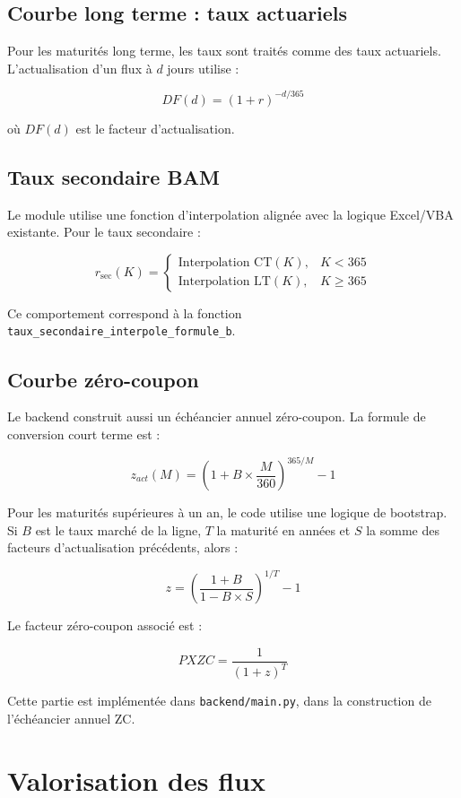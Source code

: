 \documentclass[12pt,a4paper]{article}
\begin{document}
\subsection{Courbe long terme : taux actuariels}

Pour les maturités long terme, les taux sont traités comme des taux actuariels. L'actualisation d'un flux à $d$ jours utilise :

\[
DF(d) = (1+r)^{-d/365}
\]

où $DF(d)$ est le facteur d'actualisation.

\subsection{Taux secondaire BAM}

Le module utilise une fonction d'interpolation alignée avec la logique Excel/VBA existante. Pour le taux secondaire :

\[
r_{\text{sec}}(K) =
\begin{cases}
\text{Interpolation CT}(K), & K < 365 \\
\text{Interpolation LT}(K), & K \geq 365
\end{cases}
\]

Ce comportement correspond à la fonction \texttt{taux\_secondaire\_interpole\_formule\_b}.

\subsection{Courbe zéro-coupon}

Le backend construit aussi un échéancier annuel zéro-coupon. La formule de conversion court terme est :

\[
z_{act}(M)
=
\left(1 + B \times \frac{M}{360}\right)^{365/M} - 1
\]

Pour les maturités supérieures à un an, le code utilise une logique de bootstrap. Si $B$ est le taux marché de la ligne, $T$ la maturité en années et $S$ la somme des facteurs d'actualisation précédents, alors :

\[
z =
\left(
\frac{1+B}{1-B \times S}
\right)^{1/T}
- 1
\]

Le facteur zéro-coupon associé est :

\[
PXZC = \frac{1}{(1+z)^T}
\]

Cette partie est implémentée dans \texttt{backend/main.py}, dans la construction de l'échéancier annuel ZC.

\section{Valorisation des flux}
\end{document}
